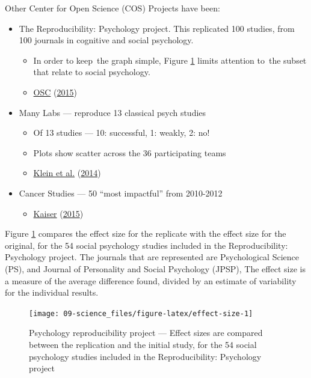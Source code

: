 \documentclass[
  10pt,
  b5paper]{book}
\providecommand{\tightlist}{%
  \setlength{\itemsep}{0pt}\setlength{\parskip}{0pt}}
\begin{document}
Other Center for Open Science (COS) Projects have been:

\begin{itemize}
\tightlist
\item
  The Reproducibility: Psychology project. This replicated
  100 studies, from 100 journals in cognitive and social
  psychology.

  \begin{itemize}
  \tightlist
  \item
    In order to keep~the graph simple, Figure
    \ref{fig:effect-size} limits attention to~the
    subset that relate to social psychology.
  \item
    \protect\hyperlink{ref-osc_EstRep2015}{OSC} (\protect\hyperlink{ref-osc_EstRep2015}{2015})
  \end{itemize}
\item
  Many Labs --- reproduce 13 classical psych studies

  \begin{itemize}
  \tightlist
  \item
    Of 13 studies --- 10: successful, 1: weakly, 2: no!
  \item
    Plots show scatter across the 36 participating teams
  \item
    \protect\hyperlink{ref-r7_klein_others_2014}{Klein et al.} (\protect\hyperlink{ref-r7_klein_others_2014}{2014})
  \end{itemize}
\item
  Cancer Studies --- 50 ``most impactful'' from 2010-2012

  \begin{itemize}
  \tightlist
  \item
    \protect\hyperlink{ref-r5_kaiser_2015}{Kaiser} (\protect\hyperlink{ref-r5_kaiser_2015}{2015})
  \end{itemize}
\end{itemize}

Figure \ref{fig:effect-size} compares the effect size for
the replicate with the effect size for the original, for
the 54 social psychology studies included in the
Reproducibility: Psychology project. The journals that
are represented are Psychological Science (PS),
and Journal of Personality and Social Psychology (JPSP),
The effect size is a measure of the average difference found,
divided by an estimate of variability for the individual
results.

\begin{figure}[H]

{\centering \texttt{[image: 09-science\_files/figure-latex/effect-size-1]} 

}

\caption{Psychology reproducibility project --- Effect sizes are
compared between the replication and the initial study, for the 
54 social psychology studies included in the Reproducibility:
Psychology project}\label{fig:effect-size}
\end{figure}
\end{document}
